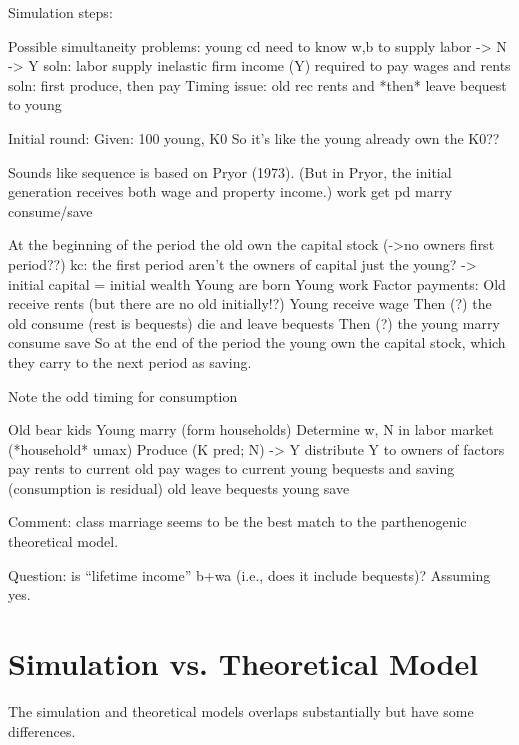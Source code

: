 \documentclass{article}
\begin{document}
Simulation steps:
\begin{verbatimtab}
Possible simultaneity problems:
        young cd need to know w,b to supply labor -> N -> Y
                soln: labor supply inelastic
        firm income (Y) required to pay wages and rents
                soln: first produce, then pay
Timing issue:
        old rec rents and *then* leave bequest to young

Initial round:
        Given: 100 young, K0
        So it's like the young already own the K0??

Sounds like sequence is based on Pryor (1973).
(But in Pryor, the initial generation receives both wage and property income.)
        work
        get pd
        marry
        consume/save

At the beginning of the period the old own the capital stock (->no owners first period??)
kc: the first period aren't the owners of capital just the young? -> initial capital = initial wealth 
Young are born
Young work
Factor payments:
        Old receive rents (but there are no old initially!?)
        Young receive wage
Then (?) the old
        consume (rest is bequests)
        die and leave bequests
Then (?) the young
        marry
        consume
        save
So at the end of the period the young own the capital stock,
which they carry to the next period as saving.

Note the odd timing for consumption

Old bear kids
Young marry (form households)
Determine w, N in labor market (*household* umax)
Produce (K pred; N) -> Y
        distribute Y to owners of factors
                pay rents to current old
                pay wages to current young
        bequests and saving (consumption is residual)
                old leave bequests
                young save


\end{verbatimtab}

Comment: class marriage seems to be the best match to the parthenogenic theoretical model.

Question: is ``lifetime income'' b+wa (i.e., does it include bequests)?  Assuming yes.
\section{Simulation vs. Theoretical Model}

The simulation and theoretical models overlaps substantially but have some differences.
\end{document}
